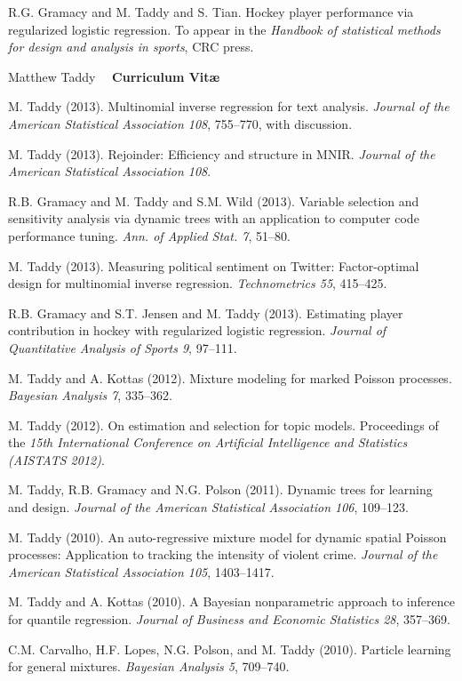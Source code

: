 \documentclass[margin,line]{res}
\begin{document}
\begin{resume}
R.G. Gramacy and M. Taddy and S. Tian.  Hockey player performance via regularized logistic regression.
To appear in the {\it Handbook of statistical methods for design and analysis in sports}, CRC press.


\pagebreak
\hfill Matthew Taddy ~~{\bf Curriculum Vit\ae}
\medskip

M. Taddy (2013).  Multinomial inverse regression for text analysis.  
{\it Journal of the American Statistical
  Association 108}, 755--770, with discussion.

M. Taddy (2013).   Rejoinder: Efficiency and structure in MNIR.  {\it Journal of the American Statistical
  Association 108}.




R.B. Gramacy and M. Taddy and S.M. Wild (2013).  Variable selection and
sensitivity analysis via dynamic trees with an application to computer
code performance tuning.  {\it Ann. of Applied
  Stat. 7}, 51--80.

M. Taddy (2013).  Measuring political sentiment on Twitter: Factor-optimal
design for multinomial inverse regression. {\it
  Technometrics 55}, 415--425.


R.B. Gramacy and S.T. Jensen and M. Taddy (2013).  Estimating player contribution in 
hockey with regularized logistic regression. {\it Journal of Quantitative Analysis of Sports 9}, 97--111.

M.  Taddy and A. Kottas (2012). Mixture modeling for marked Poisson processes.
{\it Bayesian Analysis 7}, 335--362.


M. Taddy (2012). On estimation and selection for topic models. Proceedings of the {\it 15th International Conference on
  Artificial Intelligence and Statistics (AISTATS 2012)}.


M. Taddy, R.B. Gramacy and N.G. Polson (2011). Dynamic trees for learning and design.
 {\it Journal of the American Statistical
  Association 106}, 109--123.

M. Taddy (2010). An auto-regressive mixture model for dynamic spatial
Poisson processes: Application to tracking the intensity of violent
crime.  {\it Journal of the American Statistical
  Association 105}, 1403--1417.

M.  Taddy and A. Kottas (2010). A Bayesian nonparametric approach to inference for quantile regression.
{\it Journal of Business and Economic Statistics 28}, 357--369.

C.M. Carvalho, H.F. Lopes, N.G. Polson, and M. Taddy
(2010). Particle learning for general mixtures.  {\it Bayesian
  Analysis 5}, 709--740.


\end{resume}
\end{document}
